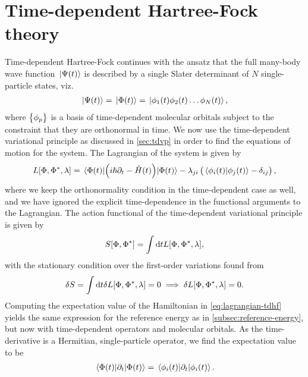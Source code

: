\section{Time-dependent Hartree-Fock theory}
    Time-dependent Hartree-Fock continues with the ansatz that the full
    many-body wave function $\ket*{\Psi(t)}$ is described by a single Slater
    determinant of $N$ single-particle states, viz.
    \begin{align}
        \ket*{\Psi(t)} = \ket*{\Phi(t)}
        = \ket*{\phi_1(t) \phi_2(t)\dots \phi_N(t)},
    \end{align}
    where $\left\{ \phi_p \right\}$ is a basis of time-dependent molecular orbitals
    subject to the constraint that they are orthonormal in time.
    We now use the time-dependent variational principle as discussed in
    \autoref{sec:tdvp} in order to find the equations of motion for the system.
    The Lagrangian of the system is given by
    \begin{align}
        L[\Phi, \Phi^{*}, \lambda]
        = \mel*{\Phi(t)}{\left( 
            i\hslash\partial_t
            - \hat{H}(t)
         \right)}{\Phi(t)}
        - \lambda_{ji}\left( 
            \braket*{\phi_i(t)}{\phi_j(t)}
            - \delta_{ij}
         \right),
        \label{eq:lagrangian-tdhf}
    \end{align}
    where we keep the orthonormality condition in the time-dependent case as
    well, and we have ignored the explicit time-dependence in the functional
    arguments to the Lagrangian.
    The action functional of the time-dependent variational principle is given
    by
    \begin{align}
        S[\Phi, \Phi^{*}]
        =
        \int \dd t L[\Phi, \Phi^{*}, \lambda],
    \end{align}
    with the stationary condition over the first-order variations found from
    \begin{align}
        \delta S
        = \int\dd t \delta L[\Phi, \Phi^{*}, \lambda]
        = 0
        \implies
        \delta L[\Phi, \Phi^{*}, \lambda]
        = 0.
    \end{align}
    Computing the expectation value of the Hamiltonian in
    \autoref{eq:lagrangian-tdhf} yields the same expression for the reference
    energy as in \autoref{subsec:reference-energy}, but now with time-dependent
    operators and molecular orbitals.
    As the time-derivative is a Hermitian, single-particle operator, we find the
    expectation value to be
    \begin{align}
        \mel*{\Phi(t)}{\partial_t}{\Phi(t)}
        = \mel*{\phi_i(t)}{\partial_t}{\phi_i(t)}.
    \end{align}
